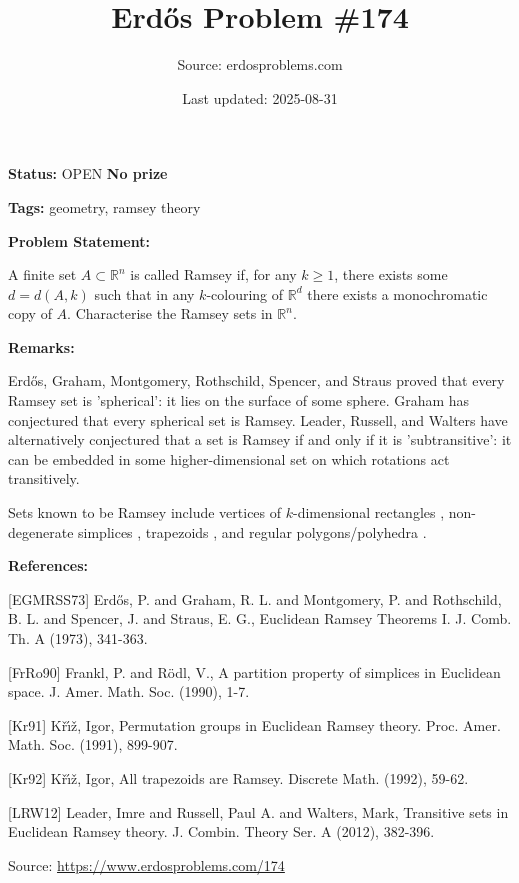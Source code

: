 \documentclass{article}
\title{Erd\H{o}s Problem \#174}
\date{Last updated: 2025-08-31}
\author{Source: erdosproblems.com}
\begin{document}
\maketitle

\noindent\textbf{Status:} OPEN \quad \textbf{No prize}

\noindent\textbf{Tags:} geometry, ramsey theory

\medskip
\noindent\textbf{Problem Statement:}

A finite set $A\subset \mathbb{R}^n$ is called Ramsey if, for any $k\geq 1$, there exists some $d=d(A,k)$ such that in any $k$-colouring of $\mathbb{R}^d$ there exists a monochromatic copy of $A$. Characterise the Ramsey sets in $\mathbb{R}^n$.

\bigskip
\noindent\textbf{Remarks:}

Erd\H{o}s, Graham, Montgomery, Rothschild, Spencer, and Straus \cite{EGMRSS73} proved that every Ramsey set is 'spherical': it lies on the surface of some sphere. Graham has conjectured that every spherical set is Ramsey. Leader, Russell, and Walters \cite{LRW12} have alternatively conjectured that a set is Ramsey if and only if it is 'subtransitive': it can be embedded in some higher-dimensional set on which rotations act transitively.

Sets known to be Ramsey include vertices of $k$-dimensional rectangles \cite{EGMRSS73}, non-degenerate simplices \cite{FrRo90}, trapezoids \cite{Kr92}, and regular polygons/polyhedra \cite{Kr91}.

\bigskip
\noindent\textbf{References:}

[EGMRSS73] Erd\H{o}s, P. and Graham, R. L. and Montgomery, P. and Rothschild, B. L. and Spencer, J. and Straus, E. G., Euclidean Ramsey Theorems I. J. Comb. Th. A (1973), 341-363.
 
 [FrRo90] Frankl, P. and R\"{o}dl, V., A partition property of simplices in Euclidean space. J. Amer. Math. Soc. (1990), 1-7.
 
 [Kr91] K\v{r}\'{\i}\v{z}, Igor, Permutation groups in Euclidean Ramsey theory. Proc. Amer. Math. Soc. (1991), 899-907.
 
 [Kr92] K\v{r}\'{\i}\v{z}, Igor, All trapezoids are Ramsey. Discrete Math. (1992), 59-62.
 
 [LRW12] Leader, Imre and Russell, Paul A. and Walters, Mark, Transitive sets in Euclidean Ramsey theory. J. Combin. Theory Ser. A (2012), 382-396.

\bigskip
\noindent\small{Source: \url{https://www.erdosproblems.com/174}}
\end{document}
